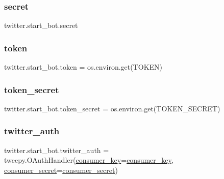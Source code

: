 \subsubsection{\texorpdfstring{secret}{secret}}
{\footnotesize\ttfamily twitter.\+start\+\_\+bot.\+secret}

\mbox{\label{namespacetwitter_1_1start__bot_a4cb2d1bc63d16dcded728840e60298b8}} 
\subsubsection{\texorpdfstring{token}{token}}
{\footnotesize\ttfamily twitter.\+start\+\_\+bot.\+token = os.\+environ.\+get(\textquotesingle{}T\+O\+K\+EN\textquotesingle{})}

\mbox{\label{namespacetwitter_1_1start__bot_add71ef8b6bdf3cc2c132ac12699e7df0}} 
\subsubsection{\texorpdfstring{token\+\_\+secret}{token\_secret}}
{\footnotesize\ttfamily twitter.\+start\+\_\+bot.\+token\+\_\+secret = os.\+environ.\+get(\textquotesingle{}T\+O\+K\+E\+N\+\_\+\+S\+E\+C\+R\+ET\textquotesingle{})}

\mbox{\label{namespacetwitter_1_1start__bot_a185f5df3f5b6e91caebbaa893db9cb29}} 
\subsubsection{\texorpdfstring{twitter\+\_\+auth}{twitter\_auth}}
{\footnotesize\ttfamily twitter.\+start\+\_\+bot.\+twitter\+\_\+auth = tweepy.\+O\+Auth\+Handler(\hyperlink{namespacetwitter_1_1start__bot_a6ee394450a1b57a8da97f52925f8a98e}{consumer\+\_\+key}=\hyperlink{namespacetwitter_1_1start__bot_a6ee394450a1b57a8da97f52925f8a98e}{consumer\+\_\+key}, \hyperlink{namespacetwitter_1_1start__bot_aa6ff8a67f0b9fa5ce0aa135e6c35e40b}{consumer\+\_\+secret}=\hyperlink{namespacetwitter_1_1start__bot_aa6ff8a67f0b9fa5ce0aa135e6c35e40b}{consumer\+\_\+secret})}

